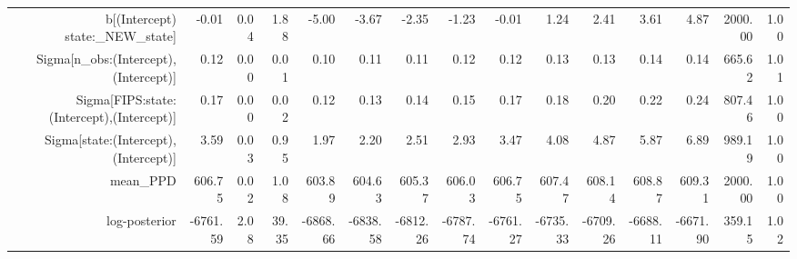 \begin{table}[ht]
\begin{tabular}{rrrrrrrrrrrrrrr}
  b[(Intercept) state:\_NEW\_state] & -0.01 & 0.04 & 1.88 & -5.00 & -3.67 & -2.35 & -1.23 & -0.01 & 1.24 & 2.41 & 3.61 & 4.87 & 2000.00 & 1.00 \\ 
  Sigma[n\_obs:(Intercept),(Intercept)] & 0.12 & 0.00 & 0.01 & 0.10 & 0.11 & 0.11 & 0.12 & 0.12 & 0.13 & 0.13 & 0.14 & 0.14 & 665.62 & 1.01 \\ 
  Sigma[FIPS:state:(Intercept),(Intercept)] & 0.17 & 0.00 & 0.02 & 0.12 & 0.13 & 0.14 & 0.15 & 0.17 & 0.18 & 0.20 & 0.22 & 0.24 & 807.46 & 1.00 \\ 
  Sigma[state:(Intercept),(Intercept)] & 3.59 & 0.03 & 0.95 & 1.97 & 2.20 & 2.51 & 2.93 & 3.47 & 4.08 & 4.87 & 5.87 & 6.89 & 989.19 & 1.00 \\ 
  mean\_PPD & 606.75 & 0.02 & 1.08 & 603.89 & 604.63 & 605.37 & 606.03 & 606.75 & 607.47 & 608.14 & 608.87 & 609.31 & 2000.00 & 1.00 \\ 
  log-posterior & -6761.59 & 2.08 & 39.35 & -6868.66 & -6838.58 & -6812.26 & -6787.74 & -6761.27 & -6735.33 & -6709.26 & -6688.11 & -6671.90 & 359.15 & 1.02 \\ 
   \hline
\end{tabular}
\end{table}
